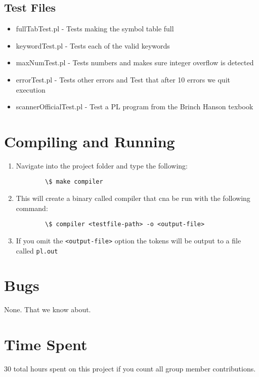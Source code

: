 \documentclass{article}
\begin{document}
\subsection{Test Files}
\begin{itemize}
	\item fullTabTest.pl - Tests making the symbol table full
	\item keywordTest.pl - Tests each of the valid keywords
	\item maxNumTest.pl - Tests numbers and makes sure integer overflow is detected
	\item errorTest.pl - Tests other errors and Test that after 10 errors we quit execution
	\item scannerOfficialTest.pl - Test a PL program from the Brinch Hanson texbook
\end{itemize}

\section{Compiling and Running}
\begin{enumerate}
	\item Navigate into the project folder and type the following:

\verb|        \$ make compiler|

	\item This will create a binary called compiler that cna be run with the following command:

\verb|        \$ compiler <testfile-path> -o <output-file>|

	\item If you omit the \verb|<output-file>| option the tokens will be output to a file called \verb|pl.out|
\end{enumerate}

\section{Bugs}
None. That we know about.


\section{Time Spent}
30 total hours spent on this project if you count all group member contributions.
\end{document}
